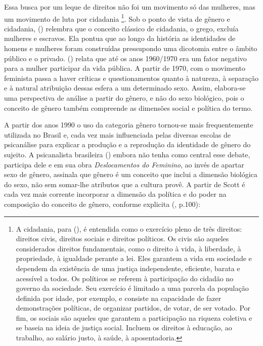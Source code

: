 Essa busca por um leque de direitos não foi um movimento só das mulheres, mas um movimento de luta por cidadania%
\footnote{A cidadania, para  (\citeyear{CARVALHO2002}), é entendida como o exercício pleno de três direitos: direitos civis, direitos sociais e direitos políticos. Os civis são aqueles considerados direitos fundamentais, como o direito à vida, à liberdade, à propriedade, à igualdade perante a lei. Eles garantem a vida em sociedade e dependem da existência de uma justiça independente, eficiente, barata e acessível a todos. Os políticos se referem à participação do cidadão no governo da sociedade. Seu exercício é limitado a uma parcela da população definida por idade, por exemplo, e consiste na capacidade de fazer demonstrações políticas, de organizar partidos, de votar, de ser votado. Por fim, os sociais são aqueles que garantem a participação na riqueza coletiva e se baseia na ideia de justiça social. Incluem os direitos à educação, ao trabalho, ao salário justo, à saúde, à aposentadoria.}. Sob o ponto de vista de gênero e cidadania,  (\citeyear{BRITO2001}) relembra que o conceito clássico de cidadania, o grego, excluía mulheres e escravos. Ela pontua que ao longo da história as identidades de homens e mulheres foram construídas pressupondo uma dicotomia entre o âmbito público e o privado.  (\citeyear{BLAY2001}) relata que até os anos 1960/1970 era um fator negativo para a mulher participar da vida pública.
A partir de 1970, com o movimento feminista passa a haver críticas e questionamentos quanto à natureza, à separação e à natural atribuição dessas esfera a um determinado sexo. Assim, elabora-se uma perspectiva de análise a partir do gênero, e não do sexo biológico, pois o conceito de gênero também compreende as dimensões social e política do termo.

A partir dos anos 1990 o uso da categoria gênero tornou-se mais frequentemente utilizada no Brasil e, cada vez mais influenciada pelas diversas escolas de psicanálise para explicar a produção e a reprodução da identidade de gênero do sujeito.
A psicanalista brasileira  (\citeyear{KEHL1998}) embora não tenha como central esse debate, participa dele e em sua obra \emph{Deslocamentos do Feminino}, ao invés de apartar sexo de gênero, assinala que gênero é um conceito que inclui a dimensão biológica do sexo, não sem somar-lhe atributos que a cultura provê.
A partir de Scott é cada vez mais corrente incorporar a dimensão da política e do poder na composição do conceito de gênero, conforme explicita  (\citeyear{MORAES1998}, p.100):

